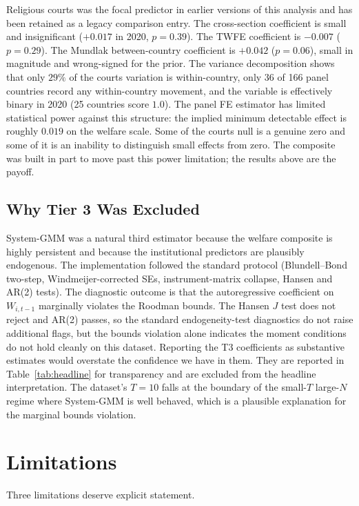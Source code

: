 \documentclass[12pt,a4paper]{article}
\begin{document}
Religious courts was the focal predictor in earlier versions of this analysis and has been retained as a legacy comparison entry. The cross-section coefficient is small and insignificant ($+0.017$ in 2020, $p = 0.39$). The TWFE coefficient is $-0.007$ ($p = 0.29$). The Mundlak between-country coefficient is $+0.042$ ($p = 0.06$), small in magnitude and wrong-signed for the prior. The variance decomposition shows that only $29\%$ of the courts variation is within-country, only 36 of 166 panel countries record any within-country movement, and the variable is effectively binary in 2020 (25 countries score $1.0$). The panel FE estimator has limited statistical power against this structure: the implied minimum detectable effect is roughly $0.019$ on the welfare scale. Some of the courts null is a genuine zero and some of it is an inability to distinguish small effects from zero. The composite was built in part to move past this power limitation; the results above are the payoff.

\subsection{Why Tier 3 Was Excluded}

System-GMM was a natural third estimator because the welfare composite is highly persistent and because the institutional predictors are plausibly endogenous. The implementation followed the standard protocol (Blundell--Bond two-step, Windmeijer-corrected SEs, instrument-matrix collapse, Hansen and AR(2) tests). The diagnostic outcome is that the autoregressive coefficient on $W_{i,t-1}$ marginally violates the Roodman bounds. The Hansen $J$ test does not reject and AR(2) passes, so the standard endogeneity-test diagnostics do not raise additional flags, but the bounds violation alone indicates the moment conditions do not hold cleanly on this dataset. Reporting the T3 coefficients as substantive estimates would overstate the confidence we have in them. They are reported in Table~\ref{tab:headline} for transparency and are excluded from the headline interpretation. The dataset's $T = 10$ falls at the boundary of the small-$T$ large-$N$ regime where System-GMM is well behaved, which is a plausible explanation for the marginal bounds violation.

\section{Limitations}

Three limitations deserve explicit statement.
\end{document}
